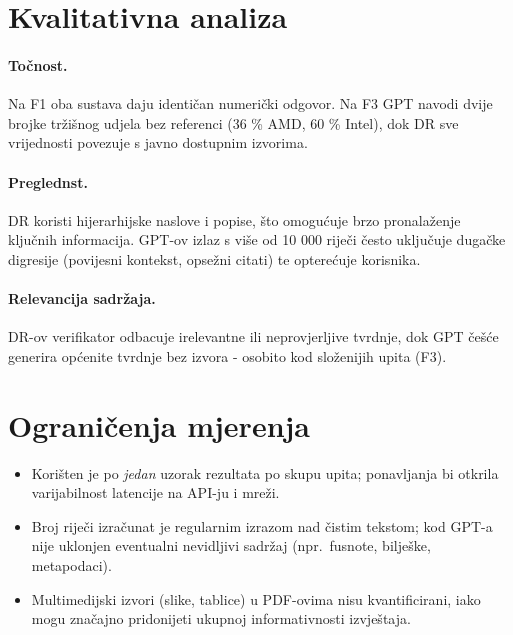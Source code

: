 \documentclass[zavrsnirad]{fer}
\begin{document}
\section{Kvalitativna analiza}

\paragraph{Točnost.}
Na F1 oba sustava daju identičan numerički odgovor.
Na F3 GPT navodi dvije brojke tržišnog udjela bez referenci
(36 \% AMD, 60 \% Intel), dok DR sve vrijednosti povezuje s javno
dostupnim izvorima.

\paragraph{Preglednst.}
DR koristi hijerarhijske naslove i popise, što
omogućuje brzo pronalaženje ključnih informacija. GPT-ov izlaz s više
od 10 000 riječi često uključuje dugačke digresije (povijesni kontekst,
opsežni citati) te opterećuje korisnika.

\paragraph{Relevancija sadržaja.}
DR-ov verifikator odbacuje irelevantne ili neprovjerljive tvrdnje, dok
GPT češće generira općenite tvrdnje bez izvora - osobito kod
složenijih upita (F3).

\section{Ograničenja mjerenja}

\begin{itemize}
  \item Korišten je po \emph{jedan} uzorak rezultata po skupu upita;
        ponavljanja bi otkrila varijabilnost latencije na API-ju i mreži.
  \item Broj riječi izračunat je regularnim izrazom nad čistim tekstom;
        kod GPT-a nije uklonjen eventualni nevidljivi sadržaj
        (npr.\ fusnote, bilješke, metapodaci).
  \item Multimedijski izvori (slike, tablice) u PDF-ovima nisu
        kvantificirani, iako mogu značajno pridonijeti ukupnoj
        informativnosti izvještaja.
\end{itemize}
\end{document}

